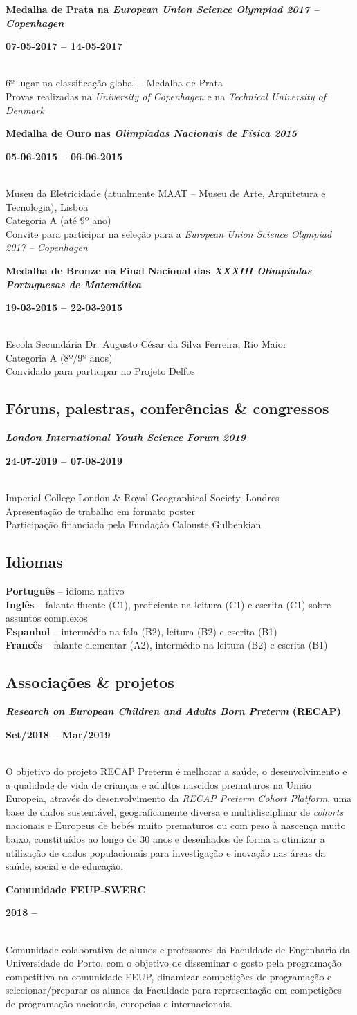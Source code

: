 \documentclass[8pt]{extarticle}
\newcommand{\parag}[1]{
\begin{minipage}{\textwidth} \hfill
\begin{minipage}{\dimexpr\textwidth-0.6cm}
	#1
\end{minipage}
\end{minipage}
}
\newcommand{\itemtime}[2]{
#1 \hfill \begin{minipage}[t]{0.185\textwidth}         #2  \end{minipage}
}
\newcommand{\job}[3]{\parag{
\itemtime{\textbf{#1}}{\textbf{#2}}\\
#3 \vspace*{9px}}}
\newcommand{\idiom}[2]{\textbf{#1} – #2\vspace*{6px}\\}
\begin{document}
\job{Medalha de Prata na \textit{European Union Science Olympiad 2017 – Copenhagen}}{07-05-2017 – 14-05-2017}{
6º lugar na classificação global – Medalha de Prata\\
Provas realizadas na \textit{University of Copenhagen} e na \textit{Technical University of Denmark}
}
\job{Medalha de Ouro nas \textit{Olimpíadas Nacionais de Física 2015}}{05-06-2015 – 06-06-2015}{
Museu da Eletricidade (atualmente MAAT – Museu de Arte, Arquitetura e Tecnologia), Lisboa\\
Categoria A (até 9º ano)\\
Convite para participar na seleção para a \textit{European Union Science Olympiad 2017 – Copenhagen}
}
\job{Medalha de Bronze na Final Nacional das \textit{XXXIII Olimpíadas Portuguesas de Matemática}}{19-03-2015 – 22-03-2015}{
Escola Secundária Dr. Augusto César da Silva Ferreira, Rio Maior\\
Categoria A (8º/9º anos)\\
Convidado para participar no Projeto Delfos
}
\subsection*{Fóruns, palestras, conferências \& congressos}
\job{\textit{London International Youth Science Forum 2019}}{24-07-2019 – 07-08-2019}{
Imperial College London \& Royal Geographical Society, Londres\\
Apresentação de trabalho em formato poster\\
Participação financiada pela Fundação Calouste Gulbenkian
}
\subsection*{Idiomas}
\parag{
\idiom{Português}{idioma nativo}
\idiom{Inglês}{falante fluente (C1), proficiente na leitura (C1) e escrita (C1) sobre assuntos complexos}
\idiom{Espanhol}{intermédio na fala (B2), leitura (B2) e escrita (B1)}
\idiom{Francês}{falante elementar (A2), intermédio na leitura (B2) e escrita (B1)}
}
\subsection*{Associações \& projetos}
\job{\textit{Research on European Children and Adults Born Preterm} (RECAP)}{Set/2018 – Mar/2019}{
O objetivo do projeto RECAP Preterm é melhorar a saúde, o desenvolvimento e a qualidade de vida de crianças e adultos nascidos prematuros na União Europeia, através do desenvolvimento da \textit{RECAP Preterm Cohort Platform}, uma base de dados sustentável, geograficamente diversa e multidisciplinar de \textit{cohorts} nacionais e Europeus de bebés muito prematuros ou com peso à nascença muito baixo, constituídos ao longo de 30 anos e desenhados de forma a otimizar a utilização de dados populacionais para investigação e inovação nas áreas da saúde, social e de educação.
}
\job{Comunidade FEUP-SWERC}{2018 – }{
Comunidade colaborativa de alunos e professores da Faculdade de Engenharia da Universidade do Porto, com o objetivo de disseminar o gosto pela programação competitiva na comunidade FEUP, dinamizar competições de programação e selecionar/preparar os alunos da Faculdade para representação em competições de programação nacionais, europeias e internacionais.
}
\end{document}
